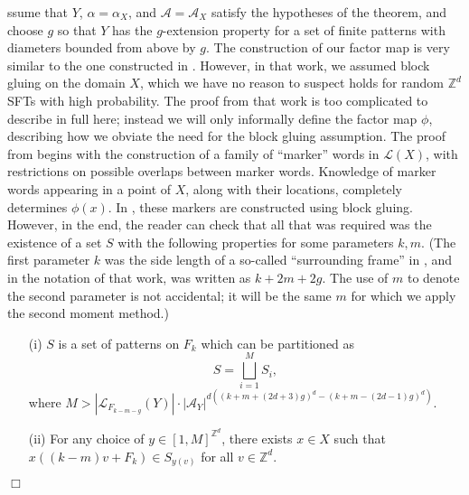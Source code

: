 \documentclass[12pt]{amsart}
\theoremstyle{definition}
\newenvironment{ProofOfFactorThm}[1]
{\par\vskip2\parsep\noindent{\sc Proof of Theorem\ \ref{Thm:Factors}. }}{{\hfill
$\Box$}
\par\vskip2\parsep}
\newcommand{\kmmargin}[1]{\marginpar{\small\textcolor{blue}{[\sl
{#1}\rm]}}}
\begin{document}
\vspace{2mm}

\begin{ProofOfFactorThm}

Assume that $Y$, $\alpha = \alpha_X$, and $\mathcal{A} = \mathcal{A}_X$ satisfy the hypotheses of the theorem, and choose $g$ so that $Y$ has the $g$-extension property for a set of finite patterns with diameters bounded from above by $g$. The construction of our factor map is very similar to the one constructed in 
\cite{McGoffPavlov_factors}. However, in that work, we assumed block gluing on the domain $X$, which we have no reason to suspect holds for random $\mathbb{Z}^d$ SFTs with high probability. The proof from that work is too complicated to describe in full here; instead we will only informally define the factor map $\phi$, describing how we obviate the need for the block gluing assumption. The proof from \cite{McGoffPavlov_factors} begins with the construction of a family of ``marker'' words in $\mathcal{L}(X)$, with restrictions on possible overlaps between marker words. Knowledge of marker words appearing in a point of $X$, along with their locations, completely determines $\phi(x)$. In \cite{McGoffPavlov_factors}, these markers are constructed using block gluing. However, in the end, the reader can check that all that was required was the existence of a set $S$ with the following properties for some parameters $k,m$. (The first parameter $k$ was the side length of a so-called ``surrounding frame'' in \cite{McGoffPavlov_factors}, and in the notation of that work, was written as 
$k + 2m + 2g$. The use of $m$ to denote the second parameter is not accidental; it will be the same $m$ for which we apply the second moment method.)

\begin{itemize}
\item[(i)] $S$ is a set of patterns on $F_k$ which can be partitioned as $$\displaystyle S = \bigsqcup_{i=1}^M S_i,$$ where 
$M > |\mathcal{L}_{F_{k-m-g}}(Y)| \cdot |\mathcal{A}_Y|^{d((k+m+(2d+3)g)^d-(k+m-(2d-1)g)^d)}$. 


\item[(ii)] For any choice of $y \in [1,M]^{\mathbb{Z}^d}$, there exists $x \in X$ such that $x((k-m)v+F_k) \in S_{y(v)}$ for all $v \in \mathbb{Z}^d$.


\end{itemize}
\end{ProofOfFactorThm}
\end{document}

